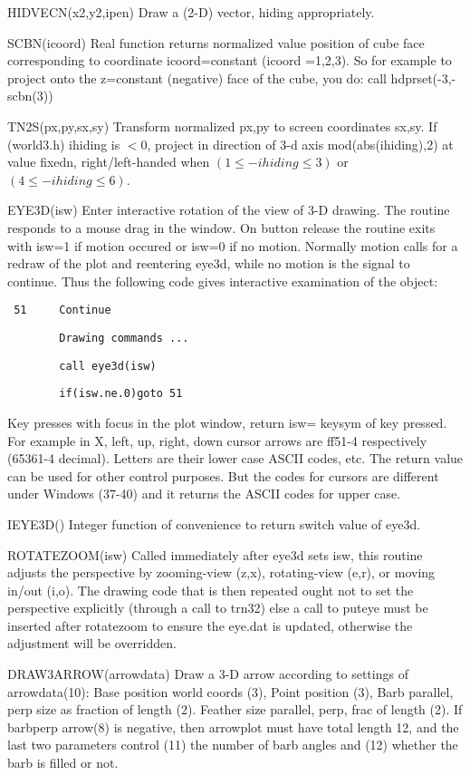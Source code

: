 \documentclass[12pt]{article}
\begin{document}
HIDVECN(x2,y2,ipen) Draw a (2-D) vector, hiding appropriately.

SCBN(icoord) Real function returns normalized value position of cube face
corresponding to coordinate icoord=constant (icoord =1,2,3). So for
example to project onto the z=constant (negative) face of the cube,
you do: call hdprset(-3,-scbn(3))

TN2S(px,py,sx,sy) Transform normalized px,py to screen coordinates
sx,sy. If (world3.h) ihiding is $<0$, project in direction of 3-d axis
mod(abs(ihiding),2) at value fixedn, right/left-handed when
$(1\le-ihiding\le3 )$ or $(4\le-ihiding\le 6)$.

EYE3D(isw) Enter interactive rotation of the view of 3-D drawing. The
routine responds to a mouse drag in the window. On button release the
routine exits with isw=1 if motion occured or isw=0 if no
motion. Normally motion calls for a redraw of the plot and reentering
eye3d, while no motion is the signal to continue. Thus the following
code gives interactive examination of the object:

\verb! 51     Continue!

\verb!        Drawing commands ...!

\verb!        call eye3d(isw)!

\verb!        if(isw.ne.0)goto 51!


Key presses with focus in the plot window, return isw= keysym of key
pressed. For example in X, left, up, right, down cursor arrows are
ff51-4 respectively (65361-4 decimal). Letters are their lower case
ASCII codes, etc.  The return value can be used for other control
purposes. But the codes for cursors are different under Windows
(37-40) and it returns the ASCII codes for upper case.
 
IEYE3D() Integer function of convenience to return switch value of eye3d.

ROTATEZOOM(isw) Called immediately after eye3d sets isw, this routine
adjusts the perspective by zooming-view (z,x), rotating-view (e,r), or
moving in/out (i,o). The drawing code that is then repeated ought not
to set the perspective explicitly (through a call to trn32) else a
call to puteye must be inserted after rotatezoom to ensure the eye.dat
is updated, otherwise the adjustment will be overridden.

DRAW3ARROW(arrowdata) Draw a 3-D arrow according to settings of
arrowdata(10): Base position world coords (3), Point position (3),
Barb parallel, perp size as fraction of length (2). 
Feather size parallel, perp, frac of length (2). If barbperp arrow(8)
is negative, then arrowplot must have total length 12, and the last
two parameters control (11) the number of barb angles and (12) whether the barb
is filled or not.
\end{document}
